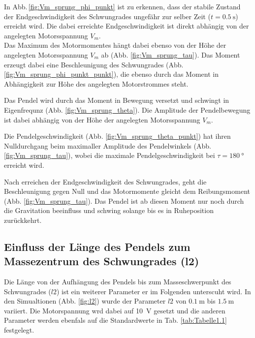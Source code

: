 In Abb.\,\ref{fig:Vm_sprung_phi_punkt} ist zu erkennen, dass der stabile Zustand der Endgeschwindigkeit des Schwungrades ungefähr zur selber Zeit ($t=\SI{0.5}{\s}$) erreicht wird.
Die dabei erreichte Endgeschwindigkeit ist direkt abhängig von der angelegten Motorsspannung $V_m$.\\
Das Maximum des Motormomentes hängt dabei ebenso von der Höhe der angelegten Motorsspannung $V_m$ ab (Abb. \ref{fig:Vm_sprung_tau}).
Das Moment erzeugt dabei eine Beschleunigung des Schwungrades (Abb. \ref{fig:Vm_sprung_phi_punkt_punkt}), die ebenso durch das Moment in Abhängigkeit zur Höhe des angelegten Motorstrommes steht.

Das Pendel wird durch das Moment in Bewegung versetzt und schwingt in Eigenfrequnz (Abb. \ref{fig:Vm_sprung_theta}). 
Die Amplitude der Pendelbewegung ist dabei abhängig von der Höhe der angelegten Motorsspannung $V_m$.

Die Pendelgeschwindigkeit (Abb. \ref{fig:Vm_sprung_theta_punkt}) hat ihren Nulldurchgang beim maximaller Amplitude des Pendelwinkels (Abb. \ref{fig:Vm_sprung_tau}), wobei die maximale Pendelgeschwindigkeit bei $\tau=\SI{180}{\degree}$ erreicht wird.

Nach erreichen der Endgeschwindigkeit des Schwungrades, geht die Beschleunigung gegen Null und das Motormomente gleicht dem Reibungsmoment (Abb. \ref{fig:Vm_sprung_tau}).
Das Pendel ist ab diesen Moment nur noch durch die Gravitation beeinfluss und schwing solange bis es in Ruheposition zurückkehrt.

\subsection*{Einfluss der Länge des Pendels zum Massezentrum des Schwungrades (l2)}
Die Länge von der Aufhängung des Pendels bis zum Masseschwerpunkt des Schwungrades ($l2$) ist ein weiterer Parameter er im Folgenden unterscuht wird.
In den Simualtionen (Abb. \ref{fig:l2}) wurde der Parameter $l2$ von $\SI{0.1}{\m}$ bis $\SI{1.5}{\m}$ variiert.
Die Motorspannung wrd dabei auf \SI{10}{\volt} gesetzt und die anderen Parameter werden ebenfals auf die Standardwerte in Tab. \ref{tab:Tabelle1.1} festgelegt.
\pagebreak

